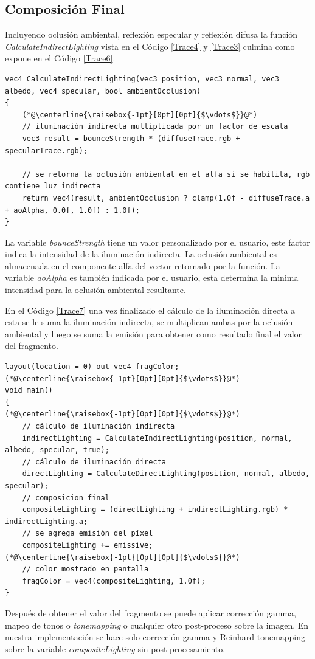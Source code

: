 \subsection{Composición Final} %
\label{sub:composicion_final}
Incluyendo oclusión ambiental, reflexión especular y reflexión difusa la función \emph{CalculateIndirectLighting} vista en el Código \ref{Trace4} y \ref{Trace3} culmina como expone en el Código \ref{Trace6}.
\\
\begin{lstlisting}[caption={Composición para la iluminación indirecta.}, label=Trace6]
vec4 CalculateIndirectLighting(vec3 position, vec3 normal, vec3 albedo, vec4 specular, bool ambientOcclusion)
{
    (*@\centerline{\raisebox{-1pt}[0pt][0pt]{$\vdots$}}@*)
    // iluminación indirecta multiplicada por un factor de escala
    vec3 result = bounceStrength * (diffuseTrace.rgb + specularTrace.rgb);

    // se retorna la oclusión ambiental en el alfa si se habilita, rgb contiene luz indirecta
    return vec4(result, ambientOcclusion ? clamp(1.0f - diffuseTrace.a + aoAlpha, 0.0f, 1.0f) : 1.0f);
}
\end{lstlisting}

La variable \emph{bounceStrength} tiene un valor personalizado por el usuario, este factor indica la intensidad de la iluminación indirecta. La oclusión ambiental es almacenada en el componente alfa del vector retornado por la función. La variable \emph{aoAlpha} es también indicada por el usuario, esta determina la minima intensidad para la oclusión ambiental resultante.

En el Código \ref{Trace7} una vez finalizado el cálculo de la iluminación directa a esta se le suma la iluminación indirecta, se multiplican ambas por la oclusión ambiental y luego se suma la emisión para obtener como resultado final el valor del fragmento.
\\
\begin{lstlisting}[caption={Composición final de imagen.}, label=Trace7]
layout(location = 0) out vec4 fragColor;
(*@\centerline{\raisebox{-1pt}[0pt][0pt]{$\vdots$}}@*)
void main()
{
(*@\centerline{\raisebox{-1pt}[0pt][0pt]{$\vdots$}}@*)
    // cálculo de iluminación indirecta
    indirectLighting = CalculateIndirectLighting(position, normal, albedo, specular, true);
    // cálculo de iluminación directa
    directLighting = CalculateDirectLighting(position, normal, albedo, specular);
    // composicion final 
    compositeLighting = (directLighting + indirectLighting.rgb) * indirectLighting.a;
    // se agrega emisión del píxel
    compositeLighting += emissive;
(*@\centerline{\raisebox{-1pt}[0pt][0pt]{$\vdots$}}@*)
    // color mostrado en pantalla
    fragColor = vec4(compositeLighting, 1.0f);
}
\end{lstlisting}

Después de obtener el valor del fragmento se puede aplicar corrección gamma, mapeo de tonos o \emph{tonemapping} o cualquier otro post-proceso sobre la imagen. En nuestra implementación se hace solo corrección gamma y Reinhard tonemapping \cite{Reinhard:2002:PTR:566570.566575} sobre la variable \emph{compositeLighting} sin post-procesamiento.
